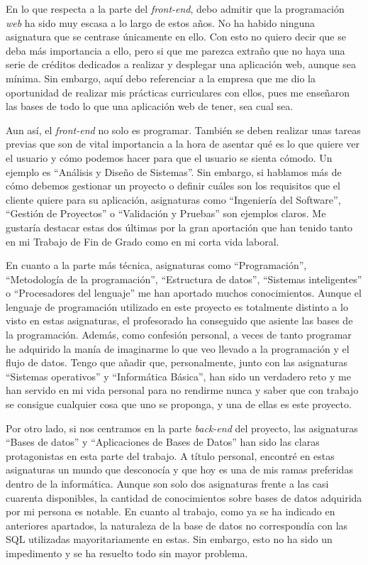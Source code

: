 	En lo que respecta a la parte del \emph{front-end}, debo admitir que la programación \emph{web} ha sido muy escasa a lo largo de estos años. No ha habido ninguna asignatura que se centrase únicamente en ello. Con esto no quiero decir que se deba más importancia a ello, pero si que me parezca extraño que no haya una serie de créditos dedicados a realizar y desplegar una aplicación web, aunque sea mínima. Sin embargo, aquí debo referenciar a la empresa que me dio la oportunidad de realizar mis prácticas curriculares con ellos, pues me enseñaron las bases de todo lo que una aplicación web de tener, sea cual sea.
	
	Aun así, el \emph{front-end} no solo es programar. También se deben realizar unas tareas previas que son de vital importancia a la hora de asentar qué es lo que quiere ver el usuario y cómo podemos hacer para que el usuario se sienta cómodo. Un ejemplo es ``Análisis y Diseño de Sistemas''. Sin embargo, si hablamos más de cómo debemos gestionar un proyecto o definir cuáles son los requisitos que el cliente quiere para su aplicación, asignaturas como ``Ingeniería del Software'', ``Gestión de Proyectos'' o ``Validación y Pruebas'' son ejemplos claros. Me gustaría destacar estas dos últimas por la gran aportación que han tenido tanto en mi Trabajo de Fin de Grado como en mi corta vida laboral.
	
	En cuanto a la parte más técnica, asignaturas como ``Programación'', ``Metodología de la programación'', ``Estructura de datos'', ``Sistemas inteligentes'' o ``Procesadores del lenguaje'' me han aportado muchos conocimientos. Aunque el lenguaje de programación utilizado en este proyecto es totalmente distinto a lo visto en estas asignaturas, el profesorado ha conseguido que asiente las bases de la programación. Además, como confesión personal, a veces de tanto programar he adquirido la manía de imaginarme lo que veo llevado a la programación y el flujo de datos. Tengo que añadir que, personalmente, junto con las asignaturas ``Sistemas operativos'' y ``Informática Básica'', han sido un verdadero reto y me han servido en mi vida personal para no rendirme nunca y saber que con trabajo se consigue cualquier cosa que uno se proponga, y una de ellas es este proyecto.
	
	Por otro lado, si nos centramos en la parte \emph{back-end} del proyecto, las asignaturas ``Bases de datos'' y ``Aplicaciones de Bases de Datos'' han sido las claras protagonistas en esta parte del trabajo. A título personal, encontré en estas asignaturas un mundo que desconocía y que hoy es una de mis ramas preferidas dentro de la informática. Aunque son solo dos asignaturas frente a las casi cuarenta disponibles, la cantidad de conocimientos sobre bases de datos adquirida por mi persona es notable. En cuanto al trabajo, como ya se ha indicado en anteriores apartados, la naturaleza de la base de datos no correspondía con las SQL utilizadas mayoritariamente en estas. Sin embargo, esto no ha sido un impedimento y se ha resuelto todo sin mayor problema.
	
